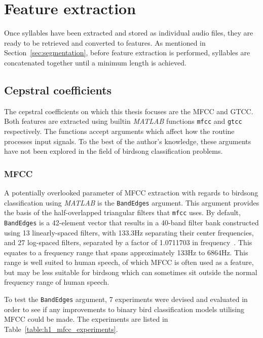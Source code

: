 \section{Feature extraction}

Once syllables have been extracted and stored as individual audio files, they
are ready to be retrieved and converted to features. As mentioned in
Section~\ref{sec:segmentation}, before feature extraction is performed,
syllables are concatenated together until a minimum length is achieved.

\subsection{Cepstral coefficients}

The cepstral coefficients on which this thesis focuses are the MFCC and GTCC\@.
Both features are extracted using builtin \textit{MATLAB} functions
\texttt{mfcc} and \texttt{gtcc} respectively. The functions accept arguments
which affect how the routine processes input signals. To the best of the
author's knowledge, these arguments have not been explored in the field of
birdsong classification problems.

\subsubsection{MFCC}\label{sssec:mfcc}

A potentially overlooked parameter of MFCC extraction with regards to birdsong
classification using \textit{MATLAB} is the \texttt{BandEdges} argument. This
argument provides the basis of the half-overlapped triangular filters that
\texttt{mfcc} uses. By default, \texttt{BandEdges} is a 42-element vector that
results in a 40-band filter bank constructed using 13 linearly-spaced filters,
with 133.3Hz separating their center frequencies, and 27 log-spaced filters,
separated by a factor of 1.0711703 in frequency~\cite{slaney1998auditory}. This
equates to a frequency range that spans approximately 133Hz to 6864Hz. This
range is well suited to human speech, of which MFCC is often used as a feature,
but may be less suitable for birdsong which can sometimes sit outside the normal
frequency range of human speech.

To test the \texttt{BandEdges} argument, 7 experiments were devised and
evaluated in order to see if any improvements to binary bird classification
models utilising MFCC could be made. The experiments are listed in
Table~\ref{table:h1_mfcc_experiments}.

